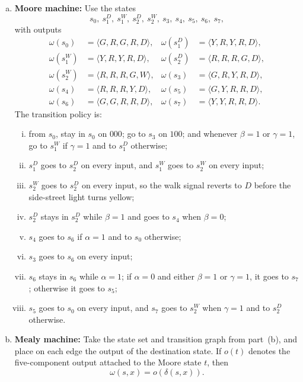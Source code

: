 \begin{enumerate}[{7.}1.]
\begin{enumerate}[(a)]
  \item \textbf{Moore machine:}  Use the states
  \[
    s_0,\ s_1^D,\ s_1^W,\ s_2^D,\ s_2^W,\ s_3,\ s_4,\ s_5,\ s_6,\ s_7,
  \]
  with outputs
  \[
  \begin{aligned}
  \omega(s_0)&=\langle G,R,G,R,D\rangle, &
  \omega(s_1^D)&=\langle Y,R,Y,R,D\rangle,\\
  \omega(s_1^W)&=\langle Y,R,Y,R,D\rangle, &
  \omega(s_2^D)&=\langle R,R,R,G,D\rangle,\\
  \omega(s_2^W)&=\langle R,R,R,G,W\rangle, &
  \omega(s_3)&=\langle G,R,Y,R,D\rangle,\\
  \omega(s_4)&=\langle R,R,R,Y,D\rangle, &
  \omega(s_5)&=\langle G,Y,R,R,D\rangle,\\
  \omega(s_6)&=\langle G,G,R,R,D\rangle, &
  \omega(s_7)&=\langle Y,Y,R,R,D\rangle.
  \end{aligned}
  \]
  The transition policy is:
  \begin{enumerate}[(i)]
    \item from $s_0$, stay in $s_0$ on $000$; go to $s_3$ on $100$; and whenever
    $\beta=1$ or $\gamma=1$, go to $s_1^W$ if $\gamma=1$ and to $s_1^D$
    otherwise;
    \item $s_1^D$ goes to $s_2^D$ on every input, and $s_1^W$ goes to $s_2^W$ on
    every input;
    \item $s_2^W$ goes to $s_2^D$ on every input, so the walk signal reverts to
    $D$ before the side-street light turns yellow;
    \item $s_2^D$ stays in $s_2^D$ while $\beta=1$ and goes to $s_4$ when
    $\beta=0$;
    \item $s_4$ goes to $s_6$ if $\alpha=1$ and to $s_0$ otherwise;
    \item $s_3$ goes to $s_6$ on every input;
    \item $s_6$ stays in $s_6$ while $\alpha=1$; if $\alpha=0$ and either
    $\beta=1$ or $\gamma=1$, it goes to $s_7$; otherwise it goes to $s_5$;
    \item $s_5$ goes to $s_0$ on every input, and $s_7$ goes to $s_2^W$ when
    $\gamma=1$ and to $s_2^D$ otherwise.
  \end{enumerate}

  \item \textbf{Mealy machine:}  Take the state set and transition graph from
  part~(b), and place on each edge the output of the destination state.  If $o(t)$ denotes the
  five-component output attached to the Moore state $t$, then
  \[
    \omega(s,x)=o(\delta(s,x)).
  \]
\end{enumerate}


\end{enumerate}
